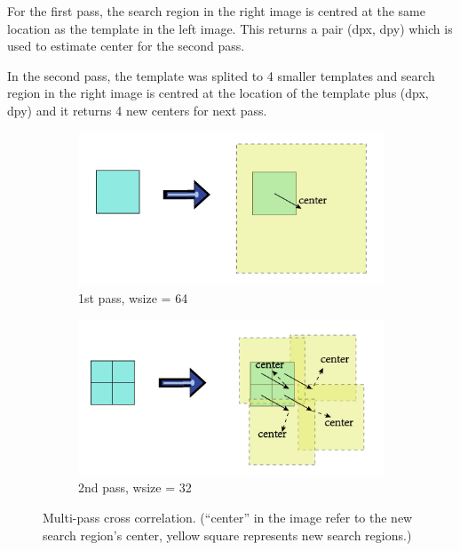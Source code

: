 For the first pass, the search region in the right image is centred at the same location as the template in the left image. This returns a pair (dpx, dpy) which is used to estimate center for the second pass.

In the second pass, the template was splited to 4 smaller templates and search region in the right image is centred at the location of the template plus (dpx, dpy) and it returns 4 new centers for next pass.

\begin{figure}[h!]
	\centering
	\begin{subfigure}[t]{0.48\linewidth}
		\centering
		\includegraphics[width=1\linewidth]{figures/part2/multi_pass1}
		\caption{1st pass, wsize = 64}
	\end{subfigure}
	\begin{subfigure}[t]{0.48\linewidth}
		\centering
		\includegraphics[width=1\linewidth]{figures/part2/multi_pass2}
		\caption{2nd pass, wsize = 32}
	\end{subfigure}
	\caption{Multi-pass cross correlation. (``center'' in the image refer to the new search region's center, yellow square represents new search regions.)}
	\label{fig:multi_pass}
\end{figure}

